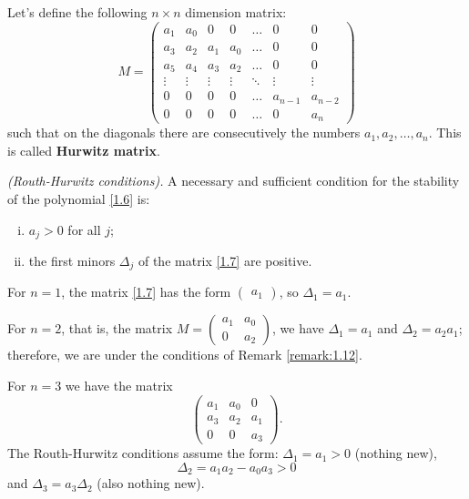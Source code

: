 Let's define the following $n\times n$ dimension matrix:
\begin{equation}\label{1.7}
	M = 
	\begin{pmatrix}
	a_1& a_0 & 0 & 0 & \ldots & 0 & 0\\ 
	a_3& a_2 & a_1 & a_0 & \ldots & 0 & 0\\ 
	a_5& a_4 & a_3 & a_2 & \ldots & 0 & 0\\
	\vdots& \vdots & \vdots & \vdots & \ddots & \vdots & \vdots\\ 
	0& 0 & 0 & 0 & \ldots & a_{n-1} & a_{n-2}\\ 
	0& 0 & 0 & 0 & \ldots & 0 & a_n
	\end{pmatrix}
\end{equation}
such that on the diagonals there are consecutively the numbers $a_1, a_2,\ldots , a_n$. This is called \textbf{Hurwitz matrix}.

\begin{theorem}\emph{(Routh-Hurwitz conditions).} \label{theo:1.13}
	A necessary and sufficient condition for the stability of the polynomial \eqref{1.6} is:
	\begin{enumerate}[(i)]
		\item $a_j > 0$ for all $j$;
		\item the first minors $\Delta_j$ of the matrix \eqref{1.7} are positive.
	\end{enumerate}
\end{theorem}

\begin{example}\label{example:1.14}
	For $n = 1$, the matrix \eqref{1.7} has the form $\begin{pmatrix}
	a_1
	\end{pmatrix}$, so $\Delta_1 = a_1$.
	
	For $n = 2$, that is, the matrix $M = \begin{pmatrix}
	a_1 & a_0\\
	0 & a_2
	\end{pmatrix}$, we have $\Delta_1 = a_1$ and $\Delta_2 = a_2a_1$; therefore, we are under the conditions of Remark \ref{remark:1.12}.
	
	For $n=3$ we have the matrix
	$$\begin{pmatrix}
	a_1 & a_0 & 0\\
	a_3 & a_2 & a_1\\
	0&0&a_3
	\end{pmatrix}.$$
	The Routh-Hurwitz conditions assume the form: $\Delta_1 = a_1> 0$ (nothing new),
	\begin{equation}\label{1.8}
		\Delta_2 = a_1a_2 - a_0a_3 >0
	\end{equation}
	and $\Delta_3 = a_3\Delta_2$ (also nothing new).
\end{example}

